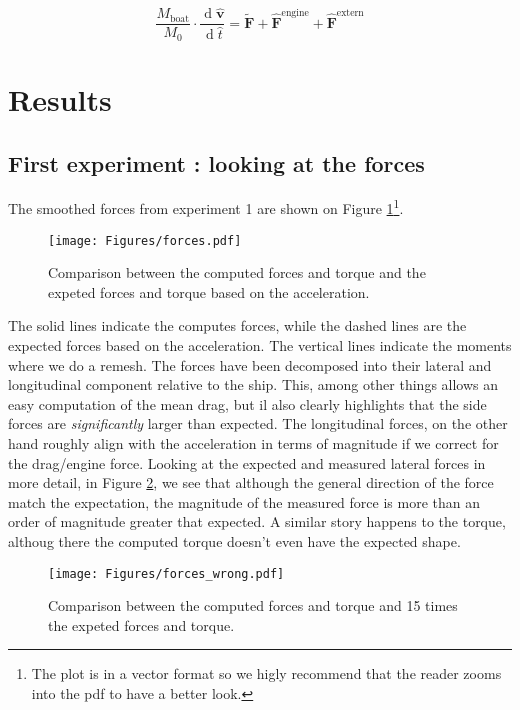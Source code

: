 \documentclass[a4paper]{article}
\DeclareMathOperator{\newdiff}{d} %
\newcommand{\dif}{\newdiff\!}
\newcommand{\fdif}[2]{\dfrac{\dif #1}{\dif #2}}
\begin{document}
\[
    \dfrac{M_\text{boat}}{M_0} \cdot \fdif{\hat{\bm{v}}}{\hat{t}} = \bm{\tilde{F}} + \bm{\hat{F}}^\text{engine} +  \bm{\hat{F}}^\text{extern}
\]

\section{Results}
\subsection{First experiment : looking at the forces}
The smoothed forces from experiment 1 are shown on Figure \ref{fig:forces}\footnote{The plot is in a vector format so we higly recommend that the reader zooms into the pdf to have a better look.}. 
\begin{figure}[hbtb]
    \centering
	\texttt{[image: Figures/forces.pdf]}
	\caption{Comparison between the computed forces and torque and the expeted forces and torque based on the acceleration.}
	\label{fig:forces}
\end{figure}
The solid lines indicate the computes forces, while the dashed lines are the expected forces based on the acceleration. The vertical lines indicate the moments where we do a remesh. The forces have been decomposed into their lateral and longitudinal component relative to the ship. This, among other things allows an easy computation of the mean drag, but il also clearly highlights that the side forces are \emph{significantly} larger than expected. The longitudinal forces, on the other hand roughly align with the acceleration in terms of magnitude if we correct for the drag/engine force. Looking at the expected and measured lateral forces in more detail, in Figure \ref{fig:forces_wrong}, we see that although the general direction of the force match the expectation, the magnitude of the measured force is more than an order of magnitude greater that expected. A similar story happens to the torque, althoug there the computed torque doesn't even have the expected shape.
\begin{figure}[hbtb]
    \centering
	\texttt{[image: Figures/forces\_wrong.pdf]}
	\caption{Comparison between the computed forces and torque and 15 times the expeted forces and torque.}
	\label{fig:forces_wrong}
\end{figure}
\end{document}
